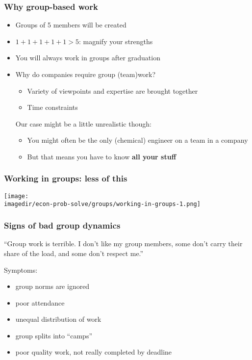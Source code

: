 \begin{frame}\frametitle{Why group-based work}
	\begin{itemize}
		\item	Groups of 5 members will be created
		\item	$1+1+1+1+1 > 5$: magnify your strengths
		\item	You will always work in groups after graduation
		\item	Why do companies require group (team)work? 
		\begin{itemize}
			\item	Variety of viewpoints and expertise are brought together
			\item	Time constraints
		\end{itemize}	
		\vspace{12pt}
		\pause
		Our case might be a little unrealistic though:
		\begin{itemize}
			\item	You might often be the only (chemical) engineer on a team in a company
			\item	But that means you have to know \textbf{all your stuff}
		\end{itemize}
	\end{itemize}
\end{frame}

\begin{frame}\frametitle{Working in groups: less of this}
	\begin{center}
		\texttt{[image: \\imagedir/econ-prob-solve/groups/working-in-groups-1.png]}
	\end{center}
\end{frame}

\begin{frame}\frametitle{Signs of bad group dynamics}
	\begin{exampleblock}{}
		``Group work is terrible. I don't like my group members, some don't carry their share of the load, and some don't respect me.''
	\end{exampleblock}
	Symptoms:
	\begin{itemize}
		\item	group norms are ignored
		\item	poor attendance
		\item	unequal distribution of work
		\item	group splits into ``camps''
		\item	poor quality work, not really completed by deadline
	\end{itemize}
\end{frame}

